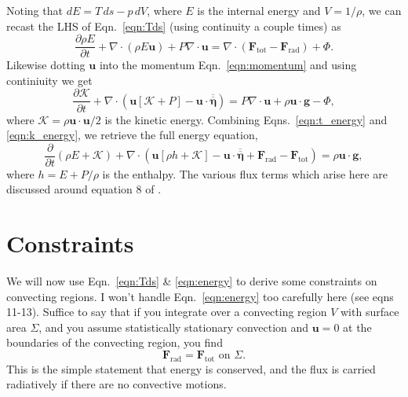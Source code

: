 \documentclass[onecolumn, amsmath, amsfonts, amssymb]{aastex62}
\newcommand{\grad}{\ensuremath{\nabla}}
\renewcommand{\bar}[1]{\ensuremath{\overline{#1}}}
\renewcommand{\vec}[1]{\ensuremath{\mathbf{#1}}}
\renewcommand{\dot}{\ensuremath{\cdot}}
\begin{document}
Noting that $dE = T\,ds - p\,dV$, where $E$ is the internal energy and $V = 1/\rho$, we can recast the LHS of Eqn.~\ref{eqn:Tds} (using continuity a couple times) as
\begin{equation}
    \frac{\partial \rho E}{\partial t} + \grad\dot(\rho E\vec{u} ) + P\grad\dot\vec{u} = \grad\dot(\vec{F}_{\mathrm{tot}} - \vec{F}_{\mathrm{rad}}) + \Phi.
    \label{eqn:t_energy}
\end{equation}
Likewise dotting $\vec{u}$ into the momentum Eqn.~\ref{eqn:momentum} and using continiuity we get
\begin{equation}
    \frac{\partial \mathcal{K}}{\partial t} + \grad\dot(\vec{u}[\mathcal{K} + P] - \vec{u}\dot\bar{\bar{\vec{\eta}}}) = P\grad\dot\vec{u} + \rho \vec{u}\dot\vec{g} - \Phi,
    \label{eqn:k_energy}
\end{equation}
where $\mathcal{K} = \rho \vec{u}\dot\vec{u} / 2$ is the kinetic energy.
Combining Eqns.~\ref{eqn:t_energy} and \ref{eqn:k_energy}, we retrieve the full energy equation,
\begin{equation}
    \frac{\partial}{\partial t} (\rho E + \mathcal{K})
    + \grad\dot (\vec{u} [\rho h + \mathcal{K}] - \vec{u}\dot\bar{\bar{\vec{\eta}}} + \vec{F}_{\mathrm{rad}} - \vec{F}_{\mathrm{tot}})
    = \rho \vec{u}\dot\vec{g},
    \label{eqn:energy}
\end{equation}
where $h = E + P/\rho$ is the enthalpy.
The various flux terms which arise here are discussed around equation 8 of \citet{anders_brown_2017}.

\newpage
\section{Constraints}
We will now use Eqn.~\ref{eqn:Tds} \& \ref{eqn:energy} to derive some constraints on convecting regions.
I won't handle Eqn.~\ref{eqn:energy} too carefully here (see \citet{roxburgh_1989} eqns 11-13).
Suffice to say that if you integrate over a convecting region $V$ with surface area $\Sigma$, and you assume statistically stationary convection and $\vec{u} = 0$ at the boundaries of the convecting region, you find
\begin{equation}
    \vec{F}_{\mathrm{rad}} = \vec{F}_{\mathrm{tot}} \,\,\text{on}\,\,\Sigma.
    \label{eqn:surface_flux}
\end{equation}
This is the simple statement that energy is conserved, and the flux is carried radiatively if there are no convective motions.
\end{document}
